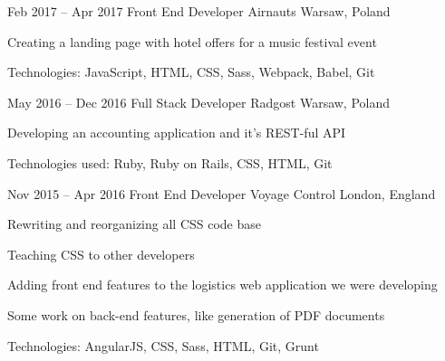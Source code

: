 \begin{sectionlist}
    \sectionlistitemjob
        {Feb 2017 -- Apr 2017}
        {Front End Developer}
        {Airnauts}
        {Warsaw, Poland}
        {
            \begin{joblisting}
                \item Creating a landing page with hotel offers for a music
                    festival event
                \item Technologies: JavaScript, HTML, CSS, Sass, Webpack,
                    Babel, Git
            \end{joblisting}
        }

    \sectionlistitemjob
        {May 2016 -- Dec 2016}
        {Full Stack Developer}
        {Radgost}
        {Warsaw, Poland}
        {
            \begin{joblisting}
                \item Developing an accounting application and it's REST-ful
                    API
                \item Technologies used: Ruby, Ruby on Rails, CSS, HTML, Git
            \end{joblisting}
        }

    \sectionlistitemjob
        {Nov 2015 -- Apr 2016}
        {Front End Developer}
        {Voyage Control}
        {London, England}
        {
            \begin{joblisting}
                \item Rewriting and reorganizing all CSS code base
                \item Teaching CSS to other developers
                \item Adding front end features to the logistics web
                    application we were developing
                \item Some work on back-end features, like generation of PDF
                    documents
                \item Technologies: AngularJS, CSS, Sass, HTML, Git, Grunt
            \end{joblisting}
        }


\end{sectionlist}
